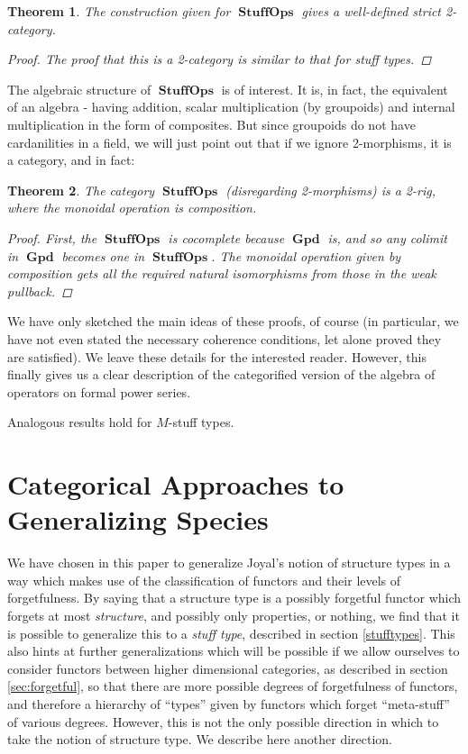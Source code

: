 \documentclass{amsart} \usepackage{amsmath,amssymb,bbm}
\newcommand{\opname}[1]{\operatorname{#1}}
\newcommand{\catname}[1]{\boldsymbol{\opname{{#1}}}}
\newtheorem{theorem}{Theorem}
\begin{document}
\begin{theorem} The construction given for $\catname{StuffOps}$
gives a well-defined strict 2-category.
  \begin{proof} 
  The proof that this is a 2-category is similar to that for stuff types.
  \end{proof}
\end{theorem}

The algebraic structure of $\catname{StuffOps}$ is of interest.  It
is, in fact, the equivalent of an algebra - having addition, scalar
multiplication (by groupoids) and internal multiplication in the form
of composites.  But since groupoids do not have cardanilities in a
field, we will just point out that if we ignore 2-morphisms, it is a
category, and in fact:

\begin{theorem} The category $\catname{StuffOps}$ (disregarding
2-morphisms) is a 2-rig, where the monoidal operation is composition.
\begin{proof}
First, the $\catname{StuffOps}$ is cocomplete because $\catname{Gpd}$
is, and so any colimit in $\catname{Gpd}$ becomes one in
$\catname{StuffOps}$.  The monoidal operation given by composition
gets all the required natural isomorphisms from those in the weak
pullback.
\end{proof}
\end{theorem}

We have only sketched the main ideas of these proofs, of course (in
particular, we have not even stated the necessary coherence
conditions, let alone proved they are satisfied).  We leave these
details for the interested reader.  However, this finally gives us a
clear description of the categorified version of the algebra of
operators on formal power series.

Analogous results hold for $M$-stuff types.

{\pagebreak}

\section{Categorical Approaches to Generalizing Species}

We have chosen in this paper to generalize Joyal's notion of structure types
in a way which makes use of the classification of functors and their levels of
forgetfulness.  By saying that a structure type is a possibly forgetful
functor which forgets at most {\textit{structure}}, and possibly only
properties, or nothing, we find that it is possible to generalize this to a
\textit{stuff type}, described in section \ref{stufftypes}.  This also hints
at further generalizations which will be possible if we allow ourselves to
consider functors between higher dimensional categories, as described in
section \ref{sec:forgetful}, so that there are more possible degrees of
forgetfulness of functors, and therefore a hierarchy of ``types'' given by
functors which forget ``meta-stuff'' of various degrees.  However, this is not
the only possible direction in which to take the notion of structure
type.  We describe here another direction.
\end{document}
